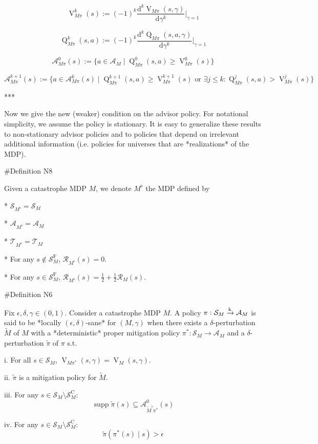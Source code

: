 \documentclass[a4paper]{article}
\DeclareMathOperator{\Supp}{supp}
\newcommand{\AP}[1]{\left(#1\right)}
\newcommand{\D}{\mathrm{d}}
\newcommand{\M}{\xrightarrow{\textnormal{k}}}
\newcommand{\A}{\mathcal{A}}
\newcommand{\St}{\mathcal{S}}
\newcommand{\T}{\mathcal{T}}
\newcommand{\R}{\mathcal{R}}
\newcommand{\RMC}{\mathrm{C}}
\newcommand{\RMF}{\mathrm{F}}
\newcommand{\SF}{\St^{\RMF}}
\newcommand{\SC}{\St^{\RMC}}
\newcommand{\V}{\operatorname{V}}
\newcommand{\Q}{\operatorname{Q}}
\begin{document}
$$\V_{M\pi}^k(s) := (-1)^k \frac{\D^k \V_{M\pi}(s,\gamma)}{\D\gamma^k}\bigg\vert_{\gamma=1}$$

$$\Q_{M\pi}^k(s,a) := (-1)^k \frac{\D^k \Q_{M\pi}(s,a,\gamma)}{\D\gamma^k}\bigg\vert_{\gamma=1}$$

$$\A_{M\pi}^0(s) := \{a \in \A_M \mid \Q_{M\pi}^0(s,a) \geq \V_{M\pi}^0(s)\}$$

$$\A_{M\pi}^{k+1}(s) := \{a \in \A_{M\pi}^k(s) \mid \Q_{M\pi}^{k+1}(s,a) \geq \V_{M\pi}^{k+1}(s) \text{ or } \exists j \leq k: \Q_{M\pi}^{j}(s,a) > \V_{M\pi}^{j}(s)\}$$

***

Now we give the new (weaker) condition on the advisor policy. For notational simplicity, we assume the policy is stationary. It is easy to generalize these results to non-stationary advisor policies and to policies that depend on irrelevant additional information (i.e. policies for universes that are *realizations* of the MDP).

\#Definition N8

Given a catastrophe MDP $M$, we denote $M^\flat$ the MDP defined by

* $\St_{M^\flat} = \St_M$

* $\A_{M^\flat} = \A_M$

* $\T_{M^\flat} = \T_M$

* For any $s\not\in\SF_M$, $\R_{M^\flat}(s) = 0$.

* For any $s \in \SF_M$, $\R_{M^\flat}(s) = \frac{1}{2} + \frac{1}{2}\R_M(s)$.

\#Definition N6

Fix $\epsilon,\delta,\gamma \in (0,1)$. Consider a catastrophe MDP $M$. A policy $\pi: \St_M \M \A_M$ is said to be *locally $(\epsilon,\delta)$-sane* for $(M,\gamma)$ when there exists a $\delta$-perturbation $\tilde{M}$ of $M$ with a *deterministic* proper mitigation policy $\pi^*: \St_M \rightarrow \A_M$ and a $\delta$-perturbation $\tilde{\pi}$ of $\pi$ s.t.

i. For all $s \in \St_M$, $\V_{M\pi^*}(s,\gamma) = \V_M(s,\gamma)$.

ii. $\tilde{\pi}$ is a mitigation policy for $\tilde{M}$.

iii. For any $s \in \St_M \setminus \SC_M$: $$\Supp{\tilde{\pi}(s)} \subseteq \A_{\tilde{M}^\flat\pi^*}^0(s)$$

iv. For any $s \in \St_M \setminus \SC_M$: $$\tilde{\pi}\AP{\pi^*(s) \mid s} > \epsilon$$

\end{document}
